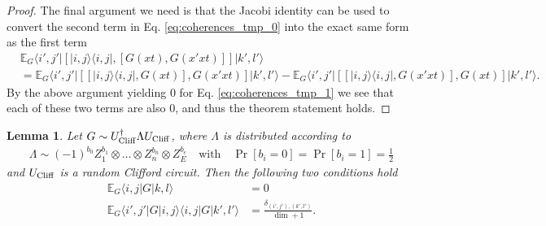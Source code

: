 \documentclass[
 amsmath,amssymb,
 aps,
onecolumn, 
nofootinbib]{revtex4-2}
\newtheorem{lemma}[theorem]{Lemma}
\newcommand{\ket}[1]{|#1\rangle}
\newcommand{\bra}[1]{\langle #1|}
\newcommand{\ketbra}[2]{| #1\rangle\! \langle #2|}
\newcommand{\EE}{\mathbb{E}}
\newcommand{\tp}{\otimes}
\begin{document}
\begin{proof}
The final argument we need is that the Jacobi identity can be used to convert the second term in Eq. \eqref{eq:coherences_tmp_0} into the exact same form as the first term
\begin{align}
    &\EE_G \bra{i',j'} [\ketbra{i,j}{i,j}, [G(xt), G(x' x t)]] \ket{k',l'} \nonumber \\
    &= \EE_G \bra{i',j'}[[\ketbra{i,j}{i,j}, G(xt)], G(x' x t)] \ket{k',l'} - \EE_G \bra{i',j'} [[\ketbra{i,j}{i,j}, G(x' x t)], G(xt)] \ket{k',l'}.
\end{align}
By the above argument yielding 0 for Eq. \eqref{eq:coherences_tmp_1} we see that each of these two terms are also 0, and thus the theorem statement holds. 
\end{proof}

\begin{lemma}
    Let $G \sim U_{\rm Cliff}^\dagger \Lambda U_{\rm Cliff}$, where $\Lambda$ is distributed according to
    \begin{align}
        \Lambda \sim (-1)^{b_0} Z_1^{b_1} \tp \ldots \tp Z_{n}^{b_n} \tp Z_E^{b_e} \quad \text{with} \quad \Pr[b_i = 0] = \Pr[b_i = 1] = \frac{1}{2}
    \end{align}
    and $U_{\rm Cliff}$ is a random Clifford circuit. Then the following two conditions hold
    \begin{align}
        \EE_G \bra{i,j} G \ket{k, l} &= 0 \\
        \EE_G \bra{i',j' } G \ket{i,j} \bra{i,j} G \ket{k', l'} &=  \frac{\delta_{(i', j'), (k', l')}}{\dim + 1}.
    \end{align}
\end{lemma}
\end{document}
